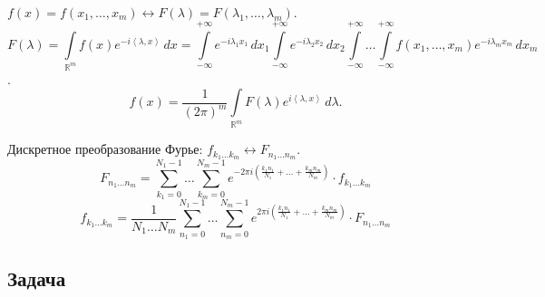 \( f(x) = f(x_1, \ldots, x_m) \leftrightarrow F(\lambda) = F(\lambda_1, \ldots, \lambda_m). \)
\[ F(\lambda) = \int \limits_{\mathbb{R}^m} f(x) e^{-i \left\langle \lambda, x \right\rangle} \, dx = \int \limits_{-\infty}^{+\infty} e^{-i \lambda_1 x_1} \, dx_1 \int \limits_{-\infty}^{+\infty} e^{-i \lambda_2 x_2} \, dx_2 \int \limits_{-\infty}^{+\infty} \ldots \int \limits_{-\infty}^{+\infty} f(x_1, \ldots, x_m) e^{-i \lambda_m x_m} \, dx_m \].
\[ f(x) = \dfrac{1}{(2 \pi)^m} \int \limits_{\mathbb{R}^m} F(\lambda) e^{i \left\langle \lambda, x \right\rangle} \, d\lambda. \]

Дискретное преобразование Фурье: \( f_{k_1 \ldots k_m} \leftrightarrow F_{n_1 \ldots n_m} \).
\[ F_{n_1 \ldots n_m} = \sum \limits_{k_1 = 0}^{N_1 - 1} \ldots \sum \limits_{k_m = 0}^{N_m - 1} e^{-2 \pi i \left( \frac{k_1 n_1}{N_1} + \ldots + \frac{k_m n_m}{N_m} \right)} \cdot f_{k_1 \ldots k_m} \]
\[ f_{k_1 \ldots k_m} = \dfrac{1}{N_1 \ldots N_m} \sum \limits_{n_1 = 0}^{N_1 - 1} \ldots \sum \limits_{n_m = 0}^{N_m - 1} e^{2 \pi i \left( \frac{k_1 n_1}{N_1} + \ldots + \frac{k_m n_m}{N_m} \right)} \cdot F_{n_1 \ldots n_m} \]

\subsection*{Задача}


